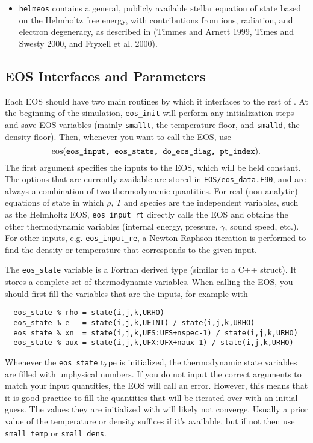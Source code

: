 \begin{itemize}
\item {\tt helmeos} contains a general, publicly available
stellar equation of state based on the Helmholtz free energy,
with contributions from ions, radiation, and electron degeneracy, as
described in (Timmes and Arnett 1999, Times and Swesty 2000, and Fryxell et al. 2000).

\end{itemize}


\subsection{EOS Interfaces and Parameters}

Each EOS should have two main routines by which it interfaces to the
rest of \castro.  At the beginning of the simulation, {\tt eos\_init}
will perform any initialization steps and save EOS variables (mainly
\texttt{smallt}, the temperature floor, and \texttt{smalld}, the
density floor). Then, whenever you want to call the EOS, use
\[
{\bf \rm eos}(\texttt{eos\_input, eos\_state, do\_eos\_diag, pt\_index}).
\]
The first argument specifies the inputs to the EOS, which will be held
constant. The options that are currently available are stored in
{\tt EOS/eos\_data.F90}, and are always a combination of two
thermodynamic quantities. For real (non-analytic) equations of state
in which $\rho$, $T$ and species are the independent variables, such
as the Helmholtz EOS, {\tt eos\_input\_rt} directly calls the EOS
and obtains the other thermodynamic variables (internal energy,
pressure, $\gamma$, sound speed, etc.). For other inputs,
e.g. {\tt eos\_input\_re}, a Newton-Raphson iteration is performed
to find the density or temperature that corresponds to the given
input.

The {\tt eos\_state} variable is a Fortran derived type (similar to
a C++ struct). It stores a complete set of thermodynamic
variables. When calling the EOS, you should first fill the variables
that are the inputs, for example with
\begin{verbatim}
  eos_state % rho = state(i,j,k,URHO)
  eos_state % e   = state(i,j,k,UEINT) / state(i,j,k,URHO)
  eos_state % xn  = state(i,j,k,UFS:UFS+nspec-1) / state(i,j,k,URHO)
  eos_state % aux = state(i,j,k,UFX:UFX+naux-1) / state(i,j,k,URHO)
\end{verbatim}
Whenever the \texttt{eos\_state} type is initialized, the
thermodynamic state variables are filled with unphysical numbers. If
you do not input the correct arguments to match your input quantities,
the EOS will call an error. However, this means that it is good
practice to fill the quantities that will be iterated over with an
initial guess. The values they are initialized with will likely not
converge. Usually a prior value of the temperature or density suffices
if it's available, but if not then use \texttt{small\_temp} or
\texttt{small\_dens}. 

